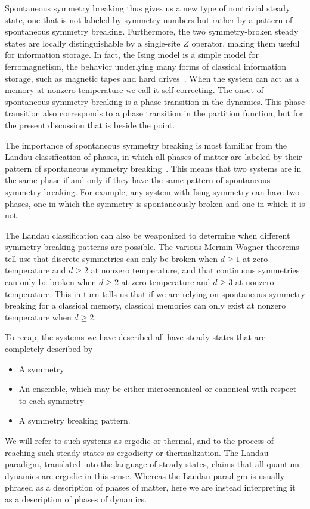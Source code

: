Spontaneous symmetry breaking thus gives us a new type of nontrivial steady state, one that is not labeled by symmetry numbers but rather by a pattern of spontaneous symmetry breaking. Furthermore, the two symmetry-broken steady states are locally distinguishable by a single-site $Z$ operator, making them useful for information storage. In fact, the Ising model is a simple model for ferromagnetism, the behavior underlying many forms of classical information storage, such as magnetic tapes and hard drives~\cite{Brown2016Finite}. When the system can act as a memory at nonzero temperature we call it self-correcting.
The onset of spontaneous symmetry breaking is a phase transition in the dynamics. This phase transition also corresponds to a phase transition in the partition function, but for the present discussion that is beside the point.

The importance of spontaneous symmetry breaking is most familiar from the Landau classification of phases, in which all phases of matter are labeled by their pattern of spontaneous symmetry breaking~\cite{Landau1980Statistical}. This means that two systems are in the same phase if and only if they have the same pattern of spontaneous symmetry breaking. For example, any system with Ising symmetry can have two phases, one in which the symmetry is spontaneously broken and one in which it is not.

The Landau classification can also be weaponized to determine when different symmetry-breaking patterns are possible. The various Mermin-Wagner theorems tell use that discrete symmetries can only be broken when $d\ge 1$ at zero temperature and $d\ge 2$ at nonzero temperature, and that continuous symmetries can only be broken when $d \ge 2$ at zero temperature and $d \ge 3$ at nonzero temperature. This in turn tells us that if we are relying on spontaneous symmetry breaking for a classical memory, classical memories can only exist at nonzero temperature when $d \ge 2$.

To recap, the systems we have described all have steady states that are completely described by
\begin{itemize}
\item A symmetry
\item An ensemble, which may be either microcanonical or canonical with respect to each symmetry
\item A symmetry breaking pattern.
\end{itemize}
We will refer to such systems as ergodic or thermal, and to the process of reaching such steady states as ergodicity or thermalization.
The Landau paradigm, translated into the language of steady states, claims that all quantum dynamics are ergodic in this sense.
Whereas the Landau paradigm is usually phrased as a description of phases of matter, here we are instead interpreting it as a description of phases of dynamics. 


